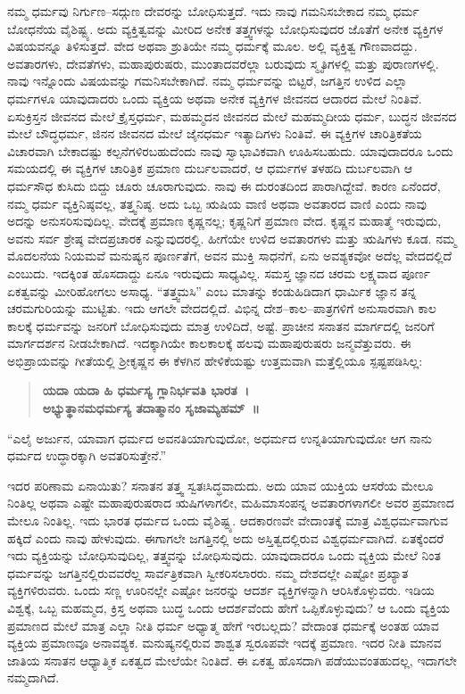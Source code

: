 ನಮ್ಮ ಧರ್ಮವು ನಿರ್ಗುಣ–ಸದ್ಗುಣ ದೇವರನ್ನು ಬೋಧಿಸುತ್ತದೆ. ಇದು ನಾವು ಗಮನಿಸಬೇಕಾದ ನಮ್ಮ ಧರ್ಮ ಬೋಧನೆಯ ವೈಶಿಷ್ಟ್ಯ. ಅದು ವ್ಯಕ್ತಿತ್ವವನ್ನು ಮೀರಿದ ಅನೇಕ ತತ್ತ್ವಗಳನ್ನು ಬೋಧಿಸುವುದರ ಜೊತೆಗೆ ಅನೇಕ ವ್ಯಕ್ತಿಗಳ ವಿಷಯವನ್ನೂ ತಿಳಿಸುತ್ತದೆ. ವೇದ ಅಥವಾ ಶ್ರುತಿಯೇ ನಮ್ಮ ಧರ್ಮಕ್ಕೆ ಮೂಲ. ಅಲ್ಲಿ ವ್ಯಕ್ತಿತ್ವ ಗೌಣವಾದದ್ದು. ಅವತಾರಗಳು, ದೇವತೆಗಳು, ಮಹಾಪುರುಷರು, ಮುಂತಾದವರೆಲ್ಲಾ ಬರುವುದು ಸ್ಮೃತಿಗಳಲ್ಲಿ ಮತ್ತು ಪುರಾಣಗಳಲ್ಲಿ. ನಾವು ಇನ್ನೊಂದು ವಿಷಯವನ್ನು ಗಮನಿಸಬೇಕಾಗಿದೆ. ನಮ್ಮ ಧರ್ಮವನ್ನು ಬಿಟ್ಟರೆ, ಜಗತ್ತಿನ ಉಳಿದ ಎಲ್ಲಾ ಧರ್ಮಗಳೂ ಯಾವುದಾದರು ಒಂದು ವ್ಯಕ್ತಿಯ ಅಥವಾ ಅನೇಕ ವ್ಯಕ್ತಿಗಳ ಜೀವನದ ಆದಾರದ ಮೇಲೆ ನಿಂತಿವೆ. ಏಸುಕ್ರಿಸ್ತನ ಜೀವನದ ಮೇಲೆ ಕ್ರೈಸ್ತಧರ್ಮ, ಮಹಮ್ಮದನ ಜೀವನದ ಮೇಲೆ ಮಹಮ್ಮದೀಯ ಧರ್ಮ, ಬುದ್ಧನ ಜೀವನದ ಮೇಲೆ ಬೌದ್ಧಧರ್ಮ, ಜಿನನ ಜೀವನದ ಮೇಲೆ ಜೈನಧರ್ಮ ಇತ್ಯಾದಿಗಳು ನಿಂತಿವೆ. ಈ ವ್ಯಕ್ತಿಗಳ ಚಾರಿತ್ರಿಕತೆಯ ವಿಚಾರವಾಗಿ ಬೇಕಾದಷ್ಟು ಕಲ್ಪನೆಗಳಿರಬಹುದೆಂದು ನಾವು ಸ್ವಾಭಾವಿಕವಾಗಿ ಊಹಿಸಬಹುದು. ಯಾವುದಾದರೂ ಒಂದು ಸಮಯದಲ್ಲಿ ಈ ವ್ಯಕ್ತಿಗಳ ಚಾರಿತ್ರಿಕ ಪ್ರಮಾಣ ದುರ್ಬಲವಾದರೆ, ಆ ಧರ್ಮಗಳ ತಳಹದಿ ದುರ್ಬಲವಾಗಿ ಆ ಧರ್ಮಸೌಧ ಕುಸಿದು ಬಿದ್ದು ಚೂರು ಚೂರಾಗುವುದು. ನಾವು ಈ ದುರಂತದಿಂದ ಪಾರಾಗಿದ್ದೇವೆ. ಕಾರಣ ಏನೆಂದರೆ, ನಮ್ಮ ಧರ್ಮ ವ್ಯಕ್ತಿನಿಷ್ಠವಲ್ಲ, ತತ್ತ್ವನಿಷ್ಠ. ಅದು ಒಬ್ಬ ಋಷಿಯ ವಾಣಿ ಅಥವಾ ಅವತಾರದ ವಾಣಿ ಎಂದು ನಾವು ಅದನ್ನು ಅನುಸರಿಸುವುದಿಲ್ಲ. ವೇದಕ್ಕೆ ಪ್ರಮಾಣ ಕೃಷ್ಣನಲ್ಲ; ಕೃಷ್ಣನಿಗೆ ಪ್ರಮಾಣ ವೇದ. ಕೃಷ್ಣನ ಮಹಾತ್ಮೆ ಇರುವುದು, ಅವನು ಸರ್ವ ಶ್ರೇಷ್ಠ ವೇದಪ್ರಚಾರಕ ಎನ್ನುವುದರಲ್ಲಿ. ಹೀಗೆಯೇ ಉಳಿದ ಅವತಾರಗಳು ಮತ್ತು ಋಷಿಗಳು ಕೂಡ. ನಮ್ಮ ಮೊದಲನೆಯ ನಿಯಮವೆ ಮನುಷ್ಯನ ಪೂರ್ಣತೆಗೆ, ಅವನ ಮುಕ್ತಿ ಸಾಧನೆಗೆ, ಏನು ಅವಶ್ಯಕವೋ ಅದೆಲ್ಲ ವೇದದಲ್ಲಿದೆ ಎಂಬುದು. ಇದಕ್ಕಿಂತ ಹೊಸದಾದ್ದು ಏನೂ ಇರುವುದು ಸಾಧ್ಯವಿಲ್ಲ. ಸಮಸ್ತ ಜ್ಞಾನದ ಚರಮ ಲಕ್ಷ್ಯವಾದ ಪೂರ್ಣ ಏಕತ್ವವನ್ನು ಮೀರಿಹೋಗಲು ಅಸಾಧ್ಯ. “ತತ್ತ್ವಮಸಿ” ಎಂಬ ಮಾತನ್ನು ಕಂಡುಹಿಡಿದಾಗ ಧಾರ್ಮಿಕ ಜ್ಞಾನ ತನ್ನ ಚರಮಗುರಿಯನ್ನು ಮುಟ್ಟಿತು. ಇದು ಆಗಲೇ ವೇದದಲ್ಲಿದೆ. ವಿಭಿನ್ನ ದೇಶ–ಕಾಲ–ಪಾತ್ರಗಳಿಗೆ ಅನುಸಾರವಾಗಿ ಕಾಲ ಕಾಲಕ್ಕೆ ಧರ್ಮವನ್ನು ಜನರಿಗೆ ಬೋಧಿಸುವುದು ಮಾತ್ರ ಉಳಿದಿದೆ, ಅಷ್ಟೆ. ಪ್ರಾಚೀನ ಸನಾತನ ಮಾರ್ಗದಲ್ಲಿ ಜನರಿಗೆ ಮಾರ್ಗದರ್ಶನ ನೀಡಬೇಕಾಗಿದೆ. ಇದಕ್ಕಾಗಿಯೇ ಕಾಲಕಾಲಕ್ಕೆ ಹಲವು ಮಹಾಪುರುಷರು ಜನ್ಮವೆತ್ತುವರು. ಈ ಅಭಿಪ್ರಾಯವನ್ನು ಗೀತೆಯಲ್ಲಿ ಶ‍್ರೀಕೃಷ್ಣನ ಈ ಕೆಳಗಿನ ಹೇಳಿಕೆಯಷ್ಟು ಉತ್ತಮವಾಗಿ ಮತ್ತೆಲ್ಲಿಯೂ ಸ್ಪಷ್ಟಪಡಿಸಿಲ್ಲ:

\begin{verse}
\textbf{ಯದಾ ಯದಾ ಹಿ ಧರ್ಮಸ್ಯ ಗ್ಲಾನಿರ್ಭವತಿ ಭಾರತ~।}\\\textbf{ಅಭ್ಯುತ್ಥಾನಮಧರ್ಮಸ್ಯ ತದಾತ್ಮಾನಂ ಸೃಜಾಮ್ಯಹಮ್​~॥}
\end{verse}

“ಎಲೈ ಅರ್ಜುನ, ಯಾವಾಗ ಧರ್ಮದ ಅವನತಿಯಾಗುವುದೋ, ಅಧರ್ಮದ ಉನ್ನತಿಯಾಗುವುದೋ ಆಗ ನಾನು ಧರ್ಮದ ಉದ್ಧಾರಕ್ಕಾಗಿ ಅವತರಿಸುತ್ತೇನೆ.”

ಇದರ ಪರಿಣಾಮ ಏನಾಯಿತು? ಸನಾತನ ತತ್ತ್ವ ಸ್ವತಃಸಿದ್ಧವಾದುದು. ಅದು ಯಾವ ಯುಕ್ತಿಯ ಆಸರೆಯ ಮೇಲೂ ನಿಂತಿಲ್ಲ ಅಥವಾ ಎಷ್ಟೇ ಮಹಾಪುರುಷರಾದ ಋಷಿಗಳಾಗಲೀ, ಮಹಿಮಾಸಂಪನ್ನ ಅವತಾರಗಳಾಗಲೀ ಅವರ ಪ್ರಮಾಣದ ಮೇಲೂ ನಿಂತಿಲ್ಲ. ಇದು ಭಾರತ ಧರ್ಮದ ಒಂದು ವೈಶಿಷ್ಟ್ಯ. ಆದಕಾರಣವೇ ವೇದಾಂತಕ್ಕೆ ಮಾತ್ರ ವಿಶ್ವಧರ್ಮವಾಗುವ ಹಕ್ಕಿದೆ ಎಂದು ನಾವು ಹೇಳುವುದು. ಈಗಾಗಲೇ ಜಗತ್ತಿನಲ್ಲಿ ಅದು ಅಸ್ತಿತ್ವದಲ್ಲಿರುವ ವಿಶ್ವಧರ್ಮವಾಗಿದೆ. ಏತಕ್ಕೆಂದರೆ ಇದು ವ್ಯಕ್ತಿಯನ್ನು ಬೋಧಿಸುವುದಿಲ್ಲ, ತತ್ತ್ವವನ್ನು ಬೋಧಿಸುವುದು. ಯಾವುದಾದರೂ ಒಂದು ವ್ಯಕ್ತಿಯ ಮೇಲೆ ನಿಂತ ಧರ್ಮವನ್ನು ಜಗತ್ತಿನಲ್ಲಿರುವವರೆಲ್ಲ ಸಾರ್ವತ್ರಿಕವಾಗಿ ಸ್ವೀಕರಿಸಲಾರರು. ನಮ್ಮ ದೇಶದಲ್ಲೇ ಎಷ್ಟೋ ಪ್ರಖ್ಯಾತ ವ್ಯಕ್ತಿಗಳಿರುವರು. ಒಂದು ಸಣ್ಣ ಊರಿನಲ್ಲೇ ಎಷ್ಟೋ ಜನರನ್ನು ಆದರ್ಶ ವ್ಯಕ್ತಿಗಳನ್ನಾಗಿ ಆರಿಸಿಕೊಳ್ಳುವರು. ಇಡಿಯ ವಿಶ್ವಕ್ಕೆ, ಒಬ್ಬ ಮಹಮ್ಮದ, ಕ್ರಿಸ್ತ ಅಥವಾ ಬುದ್ಧ ಒಂದು ಆದರ್ಶವೆಂದು ಹೇಗೆ ಒಪ್ಪಿಕೊಳ್ಳುವುದು? ಆ ಒಂದು ವ್ಯಕ್ತಿಯ ಪ್ರಮಾಣದ ಮೇಲೆ ಮಾತ್ರ ಎಲ್ಲಾ ನೀತಿ ಧರ್ಮ ಅಧ್ಯಾತ್ಮ ಹೇಗೆ ಇರಬಲ್ಲದು? ವೇದಾಂತ ಧರ್ಮಕ್ಕೆ ಅಂತಹ ಯಾವ ವ್ಯಕ್ತಿಯ ಪ್ರಮಾಣವೂ ಅನಾವಶ್ಯಕ. ಮನುಷ್ಯನಲ್ಲಿರುವ ಶಾಶ್ವತ ಸ್ವರೂಪವೇ ಇದಕ್ಕೆ ಪ್ರಮಾಣ. ಇದರ ನೀತಿ ಮಾನವ ಜಾತಿಯ ಸನಾತನ ಆಧ್ಯಾತ್ಮಿಕ ಏಕತ್ವದ ಮೇಲೆಯೇ ನಿಂತಿದೆ. ಈ ಏಕತ್ವ ಹೊಸದಾಗಿ ಪಡೆಯುವಂತಹುದಲ್ಲ, ಇದಾಗಲೇ ನಮ್ಮದಾಗಿದೆ. 


